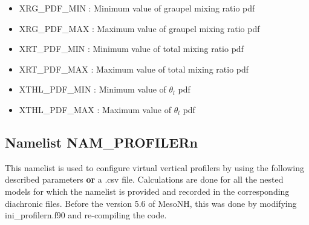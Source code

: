 \begin{itemize}
\item
XRG\_PDF\_MIN : Minimum value of graupel mixing ratio pdf

\item
XRG\_PDF\_MAX : Maximum value of graupel mixing ratio pdf

\item
XRT\_PDF\_MIN : Minimum value of total mixing ratio pdf

\item
XRT\_PDF\_MAX : Maximum value of total mixing ratio pdf

\item
XTHL\_PDF\_MIN : Minimum value of $\theta_l$ pdf

\item
XTHL\_PDF\_MAX : Maximum value of $\theta_l$ pdf

\end{itemize}

\subsection{Namelist NAM\_PROFILERn }\label{s:namprofilern}
%
This namelist is used to configure virtual vertical profilers by using the following described parameters \textbf{or} a .csv file. Calculations are done for all the nested models for which the namelist is provided and recorded in the corresponding diachronic files. Before the version 5.6 of MesoNH, this was done by modifying ini\_profilern.f90 and re-compiling the code.

